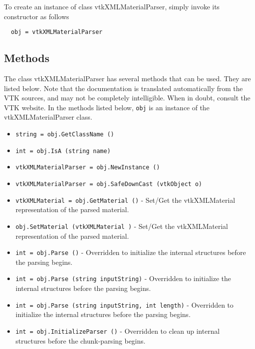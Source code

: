 To create an instance of class vtkXMLMaterialParser, simply
invoke its constructor as follows
\begin{verbatim}
  obj = vtkXMLMaterialParser
\end{verbatim}
\subsection{Methods}

The class vtkXMLMaterialParser has several methods that can be used.
  They are listed below.
Note that the documentation is translated automatically from the VTK sources,
and may not be completely intelligible.  When in doubt, consult the VTK website.
In the methods listed below, \verb|obj| is an instance of the vtkXMLMaterialParser class.
\begin{itemize}
\item  \verb|string = obj.GetClassName ()|

\item  \verb|int = obj.IsA (string name)|

\item  \verb|vtkXMLMaterialParser = obj.NewInstance ()|

\item  \verb|vtkXMLMaterialParser = obj.SafeDownCast (vtkObject o)|

\item  \verb|vtkXMLMaterial = obj.GetMaterial ()| -  Set/Get the vtkXMLMaterial representation of the parsed material.

\item  \verb|obj.SetMaterial (vtkXMLMaterial )| -  Set/Get the vtkXMLMaterial representation of the parsed material.

\item  \verb|int = obj.Parse ()| -  Overridden to initialize the internal structures before
 the parsing begins.

\item  \verb|int = obj.Parse (string inputString)| -  Overridden to initialize the internal structures before
 the parsing begins.

\item  \verb|int = obj.Parse (string inputString, int length)| -  Overridden to initialize the internal structures before
 the parsing begins.

\item  \verb|int = obj.InitializeParser ()| -  Overridden to clean up internal structures before the chunk-parsing
 begins.

\end{itemize}
